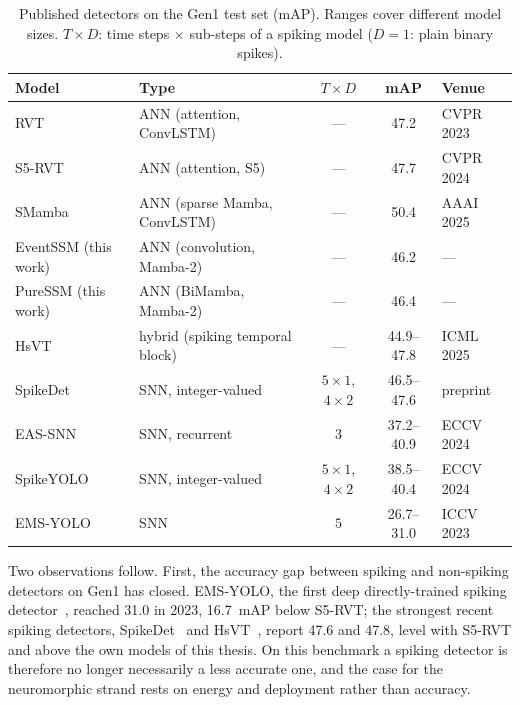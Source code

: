 \documentclass[11pt, a4paper]{report}
\begin{document}
\begin{table}[htbp]
\centering
\small
\caption[Spiking and non-spiking detectors on Gen1]{Published detectors on the Gen1 test set (mAP). Ranges cover different model sizes. $T\times D$: time steps
    $\times$ sub-steps of a spiking model ($D=1$: plain binary spikes).}
\label{tab:snn_landscape}
\begin{tabularx}{\textwidth}{@{}l>{\raggedright\arraybackslash}Xccl@{}}
\toprule
\textbf{Model} & \textbf{Type} & \textbf{$T\times D$} & \textbf{mAP} & \textbf{Venue} \\
\midrule
RVT \cite{gehrig2023recurrent}        & ANN (attention, ConvLSTM) & --- & 47.2 & CVPR 2023 \\
S5-RVT \cite{zubic2024state}          & ANN (attention, S5)       & --- & 47.7 & CVPR 2024 \\
SMamba \cite{yang2025smamba}          & ANN (sparse Mamba, ConvLSTM) & --- & 50.4 & AAAI 2025 \\
EventSSM (this work)                  & ANN (convolution, Mamba-2) & --- & 46.2 & --- \\
PureSSM (this work)                   & ANN (BiMamba, Mamba-2)    & --- & 46.4 & --- \\
\midrule
HsVT \cite{xu2025hybrid}              & hybrid (spiking temporal block) & --- & 44.9--47.8 & ICML 2025 \\
SpikeDet \cite{fan2025spikedet}       & SNN, integer-valued       & $5\times1$, $4\times2$ & 46.5--47.6 & preprint \\
EAS-SNN \cite{wang2024eas}            & SNN, recurrent            & $3$ & 37.2--40.9 & ECCV 2024 \\
SpikeYOLO \cite{luo2024integer}       & SNN, integer-valued       & $5\times1$, $4\times2$ & 38.5--40.4 & ECCV 2024 \\
EMS-YOLO \cite{su2023deep}            & SNN                       & $5$ & 26.7--31.0 & ICCV 2023 \\
\bottomrule
\end{tabularx}
\end{table}

Two observations follow. First, the accuracy gap between spiking and non-spiking detectors on Gen1 has
closed. EMS-YOLO, the first deep directly-trained spiking detector~\cite{su2023deep}, reached 31.0 in 2023,
16.7~mAP below S5-RVT; the strongest recent spiking detectors, SpikeDet~\cite{fan2025spikedet} and
HsVT~\cite{xu2025hybrid}, report 47.6 and 47.8, level with S5-RVT and above the own models of this thesis.
On this benchmark a spiking detector is therefore no longer necessarily a less accurate one, and the case
for the neuromorphic strand rests on energy and deployment rather than accuracy.
\end{document}
